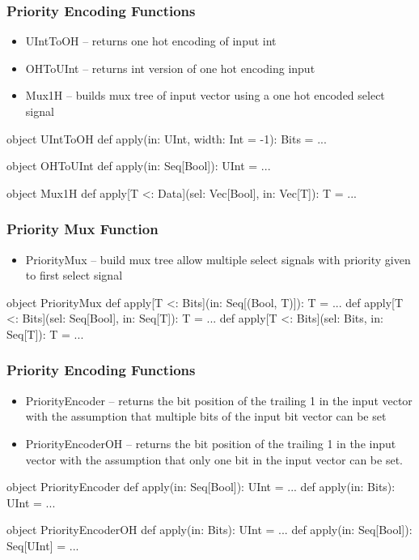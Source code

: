 \documentclass[xcolor=pdflatex,dvipsnames,table]{beamer}
\begin{document}
\begin{frame}[fragile]
\frametitle{Priority Encoding Functions}
\begin{itemize}
\item UIntToOH -- returns one hot encoding of input int
\item OHToUInt -- returns int version of one hot encoding input
\item Mux1H -- builds mux tree of input vector using a one hot encoded select signal
\end{itemize}
\begin{scala}
object UIntToOH {
  def apply(in: UInt, width: Int = -1): Bits = ...
}

object OHToUInt {
  def apply(in: Seq[Bool]): UInt = ...
}

object Mux1H {
  def apply[T <: Data](sel: Vec[Bool], in: Vec[T]): T = ...
}
\end{scala}
\end{frame}

\begin{frame}[fragile]
\frametitle{Priority Mux Function}
\begin{itemize}
\item PriorityMux -- build mux tree allow multiple select signals with priority given to first select signal
\end{itemize}
\begin{scala}
object PriorityMux {
  def apply[T <: Bits](in: Seq[(Bool, T)]): T = ...
  def apply[T <: Bits](sel: Seq[Bool], in: Seq[T]): T = ...
  def apply[T <: Bits](sel: Bits, in: Seq[T]): T = ...
}
\end{scala}
\end{frame}

\begin{frame}[fragile]
\frametitle{Priority Encoding Functions}
\begin{itemize}
\item PriorityEncoder -- returns the bit position of the trailing 1 in the input vector
  with the assumption that multiple bits of the input bit vector can be set
\item PriorityEncoderOH -- returns the bit position of the trailing 1 in the input vector
  with the assumption that only one bit in the input vector can be set.
\end{itemize}
\begin{scala}
object PriorityEncoder {
  def apply(in: Seq[Bool]): UInt = ...
  def apply(in: Bits): UInt = ...
}

object PriorityEncoderOH {
  def apply(in: Bits): UInt = ...
  def apply(in: Seq[Bool]): Seq[UInt] = ...
}
\end{scala}
\end{frame}
\end{document}

